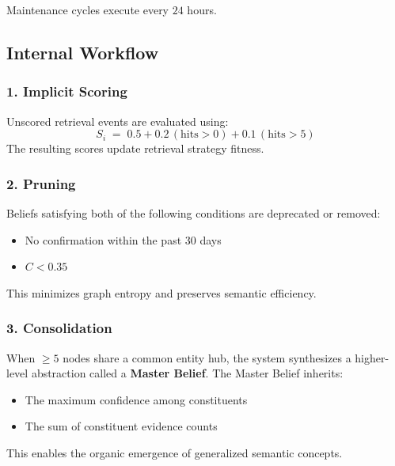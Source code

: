 \documentclass[11pt,a4paper]{article}
\begin{document}
Maintenance cycles execute every $24$ hours.

\subsection{Internal Workflow}

\subsubsection{1.\; Implicit Scoring}

Unscored retrieval events are evaluated using:
\[
    S_i \;=\; 0.5 + 0.2\,(\text{hits}>0) + 0.1\,(\text{hits}>5)
\]
The resulting scores update retrieval strategy fitness.

\subsubsection{2.\; Pruning}

Beliefs satisfying both of the following conditions are deprecated or removed:

\begin{itemize}
    \item No confirmation within the past 30 days
    \item $C < 0.35$
\end{itemize}

This minimizes graph entropy and preserves semantic efficiency.

\subsubsection{3.\; Consolidation}

When $\geq 5$ nodes share a common entity hub, the system synthesizes a higher-level
abstraction called a \textbf{Master Belief}. The Master Belief inherits:

\begin{itemize}
    \item The maximum confidence among constituents
    \item The sum of constituent evidence counts
\end{itemize}

This enables the organic emergence of generalized semantic concepts.

\end{document}

